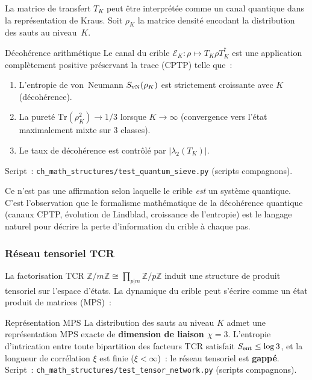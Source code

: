 \documentclass[12pt,a4paper]{article}
\begin{document}
La matrice de transfert $T_K$ peut être interprétée comme un canal
quantique dans la représentation de Kraus. Soit $\rho_K$ la matrice
densité encodant la distribution des sauts au niveau~$K$.

\begin{thmbox}{Décohérence arithmétique}
\label{thm:decoherence}
Le canal du crible $\mathcal{E}_K\colon \rho \mapsto T_K \rho
T_K^\dagger$ est une application complètement positive préservant la
trace (CPTP) telle que~:
\begin{enumerate}[nosep]
\item L'entropie de von~Neumann $S_{\rm vN}(\rho_K)$ est strictement
  croissante avec $K$ (décohérence).
\item La pureté $\mathrm{Tr}(\rho_K^2) \to 1/3$ lorsque $K \to \infty$
  (convergence vers l'état maximalement mixte sur 3 classes).
\item Le taux de décohérence est contrôlé par $|\lambda_2(T_K)|$.
\end{enumerate}
Script~: \texttt{ch\_math\_structures/test\_quantum\_sieve.py}
(scripts compagnons).
\end{thmbox}

Ce n'est pas une affirmation selon laquelle le crible \emph{est} un
système quantique. C'est l'observation que le formalisme mathématique
de la décohérence quantique (canaux CPTP, évolution de Lindblad,
croissance de l'entropie) est le langage naturel pour décrire la
perte d'information du crible à chaque pas.

\subsubsection{Réseau tensoriel TCR}

La factorisation TCR $\mathbb{Z}/m\mathbb{Z} \cong
\prod_{p|m} \mathbb{Z}/p\mathbb{Z}$ induit une structure de produit
tensoriel sur l'espace d'états. La dynamique du crible peut s'écrire
comme un état produit de matrices (MPS)~:

\begin{thmbox}{Représentation MPS}
\label{thm:mps}
La distribution des sauts au niveau $K$ admet une représentation MPS
exacte de \textbf{dimension de liaison $\chi = 3$}. L'entropie
d'intrication entre toute bipartition des facteurs TCR satisfait
$S_{\rm ent} \leq \log 3$, et la longueur de corrélation $\xi$ est
finie ($\xi < \infty$)~: le réseau tensoriel est \textbf{gappé}.
Script~: \texttt{ch\_math\_structures/test\_tensor\_network.py}
(scripts compagnons).
\end{thmbox}
\end{document}
